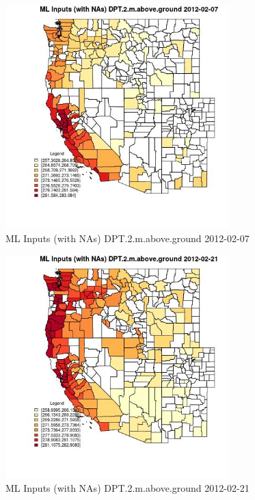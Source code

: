 \clearpage 

\begin{figure} 
\centering  
\includegraphics[width=0.77\textwidth]{Code_Outputs/Report_ML_input_PM25_Step4_part_f_de_duplicated_aves_prioritize_24hr_obswNAs_CountyDPT2mabovegroundMean2012-02-07.jpg} 
\caption{\label{fig:Report_ML_input_PM25_Step4_part_f_de_duplicated_aves_prioritize_24hr_obswNAsCountyDPT2mabovegroundMean2012-02-07}ML Inputs (with NAs) DPT.2.m.above.ground 2012-02-07} 
\end{figure} 
 

\begin{figure} 
\centering  
\includegraphics[width=0.77\textwidth]{Code_Outputs/Report_ML_input_PM25_Step4_part_f_de_duplicated_aves_prioritize_24hr_obswNAs_CountyDPT2mabovegroundMean2012-02-21.jpg} 
\caption{\label{fig:Report_ML_input_PM25_Step4_part_f_de_duplicated_aves_prioritize_24hr_obswNAsCountyDPT2mabovegroundMean2012-02-21}ML Inputs (with NAs) DPT.2.m.above.ground 2012-02-21} 
\end{figure} 
 

